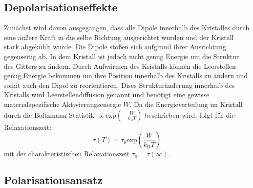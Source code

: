 	\subsection{Depolarisationseffekte}
		
		Zunächst wird davon ausgegangen, dass alle Dipole innerhalb des Kristalles durch eine äußere Kraft in die selbe Richtung ausgerichtet wurden und der Kristall stark abgekühlt wurde.
		Die Dipole stoßen sich aufgrund ihrer Ausrichtung gegenseitig ab. In dem Kristall ist jedoch nicht genug Energie um die Struktur des Gitters zu ändern.
		Durch Aufwärmen des Kristalls können die Leerstellen genug Energie bekommen um ihre Position innerhalb des Kristalls zu ändern und somit auch den Dipol zu reorientieren.
		Dises Strukturänderung innerhalb des Kristalls wird Leerstellendiffusion genannt und benötigt eine gewisse materialspezifische Aktivierungsenergie $W$.
		Da die Energieverteilung im Kristall durch die Boltzmann-Statistik $\propto\text{exp}\left(-\frac{W}{k_\text{B}T}\right)$ beschrieben wird, folgt für die Relaxationszeit:\\
		\begin{equation}
			\tau(T) = \tau_0 \text{exp}\left(\frac{W}{k_\text{B}T}\right)
			\label{eqn:tau0}
		\end{equation}
		mit der charakteristischen Relaxationszeit $\tau_0 = \tau(\infty)$.

	\subsection{Polarisationsansatz}

